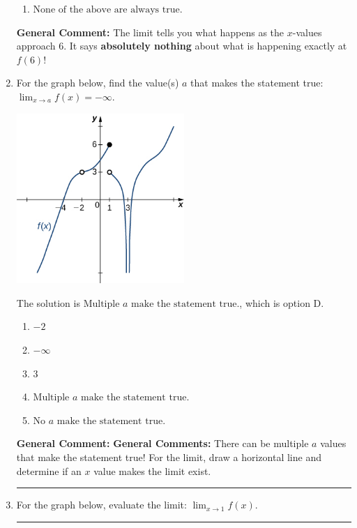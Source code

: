 \documentclass{extbook}[14pt]
\newcommand{\litem}[1]{\item #1

\rule{\textwidth}{0.4pt}}
\begin{document}
\begin{enumerate}
{\begin{enumerate}[label=\Alph*.]
\item \( \text{None of the above are always true.} \)


\end{enumerate}

\textbf{General Comment:} The limit tells you what happens as the $x$-values approach $6$. It says \textbf{absolutely nothing} about what is happening exactly at $f(6)$!
}
\litem{
For the graph below, find the value(s) $a$ that makes the statement true: $ \displaystyle \lim_{x \rightarrow a} f(x) = -\infty$.

\begin{center}
    \includegraphics[width=0.5\textwidth]{../Figures/evaluateLimitGraphicallyCopyA.png}
\end{center}


The solution is \( \text{Multiple } a \text{ make the statement true}. \), which is option D.\begin{enumerate}[label=\Alph*.]
\item \( -2 \)


\item \( -\infty \)


\item \( 3 \)


\item \( \text{Multiple } a \text{ make the statement true}. \)


\item \( \text{No } a \text{ make the statement true}. \)


\end{enumerate}

\textbf{General Comment:} \textbf{General Comments:} There can be multiple $a$ values that make the statement true! For the limit, draw a horizontal line and determine if an $x$ value makes the limit exist.
}
\litem{
For the graph below, evaluate the limit: $ \displaystyle \lim_{x \rightarrow 1} f(x)$.

}
\end{enumerate}
\end{document}
